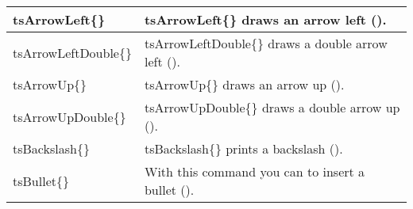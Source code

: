 \begin{footnotesize}
\begin{longtable}{ | p{} | p{} | }
        \hline
        \tsBackslash{}tsArrowLeft\{\}                                                               & \tsBackslash{}tsArrowLeft\{\} draws an arrow
        left (\tsArrowLeft{}).                                                                                                                                  \\
        \hline
        \tsBackslash{}tsArrowLeftDouble\{\}                                                         & \tsBackslash{}tsArrowLeftDouble\{\} draws a double arrow
        left (\tsArrowLeftDouble{}).                                                                                                                            \\
        \hline
        \tsBackslash{}tsArrowUp\{\}                                                                 & \tsBackslash{}tsArrowUp\{\} draws an arrow
        up (\tsArrowUp{}).                                                                                                                                      \\
        \hline
        \tsBackslash{}tsArrowUpDouble\{\}                                                           & \tsBackslash{}tsArrowUpDouble\{\} draws a double arrow
        up (\tsArrowUpDouble{}).                                                                                                                                \\
        \hline
        \tsBackslash{}tsBackslash\{\}                                                               & \tsBackslash{}tsBackslash\{\} prints a backslash
        (\tsBackslash{}).                                                                                                                                       \\
        \hline
        \tsBackslash{}tsBullet\{\}                                                                  & With this command you can to insert a bullet
        (\tsBullet{}).                                                                                                                                          \\

\end{longtable}
\end{footnotesize}
